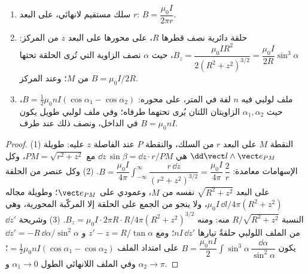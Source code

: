 \begin{proposition}\label{prop:b1:magnetostatics:three}
\begin{enumerate}
  \item سلك مستقيم لانهائي، على البعد $r$: $B = \dfrac{\mu_0I}{2\pi r}$.
  \item حلقة دائرية نصف قطرها $R$، على محورها على البعد $z$ من
        المركز: $B_z = \dfrac{\mu_0IR^2}{2(R^2 + z^2)^{3/2}} = \dfrac{\mu_0I}{2R}
        \sin^3\alpha$، حيث $\alpha$ نصف الزاوية التي تُرى الحلقة
        تحتها من $M$؛ وعند المركز $B = \mu_0I/2R$.
  \item ملف لولبي فيه $n$ لفة في المتر، على محوره: $B = \tfrac12\mu_0nI
        (\cos\alpha_1 - \cos\alpha_2)$، حيث $\alpha_1, \alpha_2$ الزاويتان اللتان
        يُرى تحتهما طرفاه؛ وفي ملف لولبي طويل يكون $B = \mu_0nI$
        في الداخل، ونصف ذلك عند طرف.
\end{enumerate}
\end{proposition}

\begin{proof}
(1) النقطة $M$ على البعد $r$ من السلك، والنقطة $P$ عند الفاصلة $z$ عليه:
طويلة $\dd\vect l\wedge\vect e_{PM}$ هي $\dd z\,\sin\beta = \dd z\cdot r/PM$
مع $PM = \sqrt{r^2 + z^2}$، وكل الإسهامات معامدة:
$B = \dfrac{\mu_0I}{4\pi}\displaystyle\int_{-\infty}^{\infty}\dfrac{r\,\dd z}{(r^2 + z^2)^{3/2}}
= \dfrac{\mu_0I}{4\pi}\,\dfrac{2}{r}$. (2) وكل عنصر من الحلقة على
البعد $\sqrt{R^2 + z^2}$ نفسه من $M$، وعمودي على
$\vect e_{PM}$؛ وطويلة مجاله $\mu_0I\,\dd l/4\pi(R^2 + z^2)$، ولا
ينجو من الجمع على الحلقة إلا المركّبة المحورية، وهي النسبة $R/\sqrt{R^2 + z^2}$
منه: ومنه $B_z = \mu_0I\cdot2\pi R\cdot R/4\pi(R^2 +
z^2)^{3/2}$. (3) وشريحة $\dd z'$ من الملف اللولبي حلقةٌ تيارها
$nI\,\dd z'$؛ ومع $z' - z = R/\tan\alpha$ و $\dd z' = -R\,\dd\alpha/\sin^2\alpha$
يكون $B = \dfrac{\mu_0nI}{2}\displaystyle\int\sin^3\alpha\,\dfrac{\dd\alpha}{\sin^2\alpha}$ على امتداد
الملف $= \tfrac12\mu_0nI(\cos\alpha_1 - \cos\alpha_2)$؛ وفي الملف اللانهائي
الطول $\alpha_1 \to 0$ و $\alpha_2 \to \pi$.
\end{proof}


